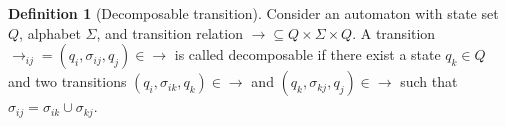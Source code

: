 \documentclass[lettersize,journal]{IEEEtran}
\theoremstyle{italiclemma}
\theoremstyle{italiclemma}
\theoremstyle{definition}
\newtheorem{definition}{Definition}
\begin{document}

\begin{definition}[Decomposable transition]
\label{def:decomposable_transition}
Consider an automaton with state set $Q$, alphabet $\Sigma$, and transition relation $\rightarrow\subseteq Q\times\Sigma\times Q$.
A transition $\rightarrow_{ij}=(q_i,\sigma_{ij},q_j)\in\rightarrow$ is called decomposable if there exist a state $q_k\in Q$ and two
transitions $(q_i,\sigma_{ik},q_k)\in\rightarrow$ and $(q_k,\sigma_{kj},q_j)\in\rightarrow$ such that
$\sigma_{ij}=\sigma_{ik}\cup\sigma_{kj}$.
\end{definition}
\end{document}
